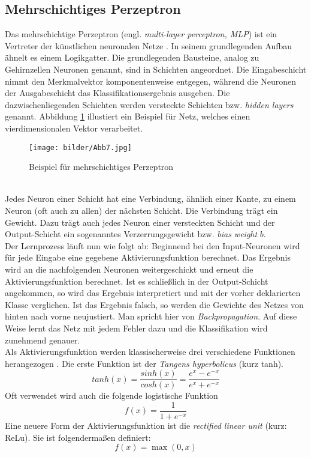 \subsection{Mehrschichtiges Perzeptron}\label{mlp}
Das mehrschichtige Perzeptron (engl. \textit{multi-layer perceptron, MLP}) ist ein Vertreter der künstlichen neuronalen Netze \citep{du2014}. In seinem grundlegenden Aufbau ähnelt es einem Logikgatter. Die grundlegenden Bausteine, analog zu Gehirnzellen Neuronen genannt, sind in Schichten angeordnet. Die Eingabeschicht nimmt den Merkmalvektor komponentenweise entgegen, während die Neuronen der Ausgabeschicht das Klassifikationsergebnis ausgeben. Die dazwischenliegenden Schichten werden versteckte Schichten bzw. \textit{hidden layers} genannt. Abbildung \ref{mlp-ex} illustiert ein Beispiel für Netz, welches einen vierdimensionalen Vektor verarbeitet.\\
 \begin{figure}[htb]
	\begin{center}
		\texttt{[image: bilder/Abb7.jpg]}
		\caption{Beispiel für mehrschichtiges Perzeptron}\label{mlp-ex}
	\end{center}
\end{figure}\\
Jedes Neuron einer Schicht hat eine Verbindung, ähnlich einer Kante, zu einem Neuron (oft auch zu allen) der nächsten Schicht. Die Verbindung trägt ein Gewicht. Dazu trägt auch jedes Neuron einer versteckten Schicht und der Output-Schicht ein sogenanntes Verzerrungsgewicht bzw. \textit{bias weight} $b$.\\
 Der Lernprozess läuft nun wie folgt ab: Beginnend bei den Input-Neuronen wird für jede Eingabe eine gegebene Aktivierungsfunktion berechnet. Das Ergebnis wird an die nachfolgenden Neuronen weitergeschickt und erneut die Aktivierungsfunktion berechnet. Ist es schließlich in der Output-Schicht angekommen, so wird das Ergebnis interpretiert und mit der vorher deklarierten Klasse verglichen. Ist das Ergebnis falsch, so werden die Gewichte des Netzes von hinten nach vorne neujustiert. Man spricht hier von \textit{Backpropagation}. Auf diese Weise lernt das Netz mit jedem Fehler dazu und die Klassifikation wird zunehmend genauer.\\
 Als Aktivierungsfunktion werden klassischerweise drei verschiedene Funktionen herangezogen \citep{nwankpa2018activation}. Die erste Funktion ist der \textit{Tangens hyperbolicus} (kurz tanh).
 \begin{equation}
 	tanh(x) = \frac{sinh(x)}{cosh(x)} = \frac{e^x - e^{-x}}{e^x + e^{-x}}
 \end{equation}
 Oft verwendet wird auch die folgende logistische Funktion
 \begin{equation}
 	f(x) = \frac{1}{1 + e^{-x}}
 \end{equation}
 Eine neuere Form der Aktivierungsfunktion ist die \textit{rectified linear unit} (kurz: ReLu). Sie ist folgendermaßen definiert:
 \begin{equation}
 	f(x) = \max(0, x)
 \end{equation}
\pagebreak